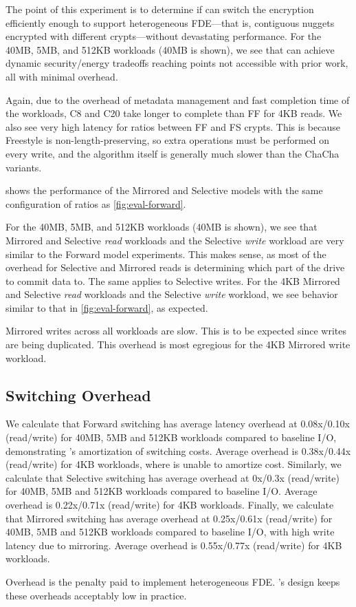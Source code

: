 

The point of this experiment is to determine if \sys can switch the encryption
efficiently enough to support heterogeneous FDE---that is, contiguous nuggets
encrypted with different crypts---without devastating performance. For the 40MB,
5MB, and 512KB workloads (40MB is shown), we see that \sys can achieve dynamic
security/energy tradeoffs reaching points not accessible with prior work, all
with minimal overhead.

Again, due to the overhead of metadata management and fast completion time of
the workloads, C8 and C20 take longer to complete than FF for 4KB reads. We also
see very high latency for ratios between FF and FS crypts. This is because
Freestyle is non-length-preserving, so extra operations must be performed on
every write, and the algorithm itself is generally much slower than the ChaCha
variants.

 shows the performance of the Mirrored and Selective models
with the same configuration of ratios as \cref{fig:eval-forward}.

For the 40MB, 5MB, and 512KB workloads (40MB is shown), we see that Mirrored and
Selective {\em read} workloads and the Selective {\em write} workload are very
similar to the Forward model experiments. This makes sense, as most of the
overhead for Selective and Mirrored reads is determining which part of the drive
to commit data to. The same applies to Selective writes. For the 4KB Mirrored
and Selective {\em read} workloads and the Selective {\em write} workload, we
see behavior similar to that in \cref{fig:eval-forward}, as expected.

Mirrored writes across all workloads are slow. This is to be expected since
writes are being duplicated. This overhead is most egregious for the 4KB
Mirrored write workload.


\subsection{Switching Overhead}\label{subsec:eval-overhead}

We calculate that Forward switching has average latency overhead at 0.08x/0.10x
(read/write) for 40MB, 5MB and 512KB workloads compared to baseline I/O,
demonstrating \sys's amortization of switching costs. Average overhead is
0.38x/0.44x (read/write) for 4KB workloads, where \sys is unable to amortize
cost. Similarly, we calculate that Selective switching has average overhead at
0x/0.3x (read/write) for 40MB, 5MB and 512KB workloads compared to baseline I/O.
Average overhead is 0.22x/0.71x (read/write) for 4KB workloads. Finally, we
calculate that Mirrored switching has average overhead at 0.25x/0.61x
(read/write) for 40MB, 5MB and 512KB workloads compared to baseline I/O, with
high write latency due to mirroring. Average overhead is 0.55x/0.77x
(read/write) for 4KB workloads.

Overhead is the penalty paid to implement heterogeneous FDE. \sys's design keeps
these overheads acceptably low in practice.
